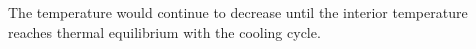 The temperature would continue to decrease until the interior temperature reaches thermal equilibrium with the cooling cycle.